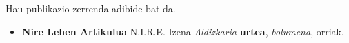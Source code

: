 
Hau publikazio zerrenda adibide bat da.


\begin{itemize}
  \item \textbf{Nire Lehen Artikulua}
    \newline N.I.R.E. Izena
    \newline \emph{Aldizkaria} \textbf{urtea}, \emph{bolumena}, orriak.
\end{itemize}
